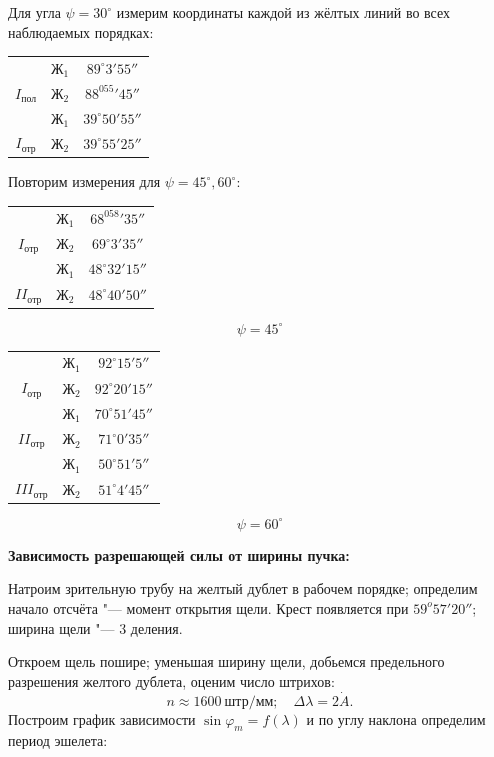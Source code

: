 Для угла $\psi = 30^\circ$ измерим координаты каждой из жёлтых линий во всех наблюдаемых порядках:

\begin{center}
\begin{tabular}{|c|c|c|} \hline
& $Ж_1$ & $89^\circ3'55''$ \\
\cline{2-3}
$I_{пол}$
& $Ж_2$ & $88^055'45''$ \\\hline
& $Ж_1$ & $39^\circ50'55''$ \\
\cline{2-3}
$I_{отр}$
& $Ж_2$ & $39^\circ55'25''$ \\\hline
\end{tabular}
\end{center}
Повторим измерения для $\psi = 45^\circ, 60^\circ$:
   
\begin{center}
\begin{tabular}{|c|c|c|} \hline
& $Ж_1$ & $68^058'35''$\\
\cline{2-3}
$I_{отр}$
& $Ж_2$ & $69^\circ3'35''$ \\\hline
& $Ж_1$ & $48^\circ32'15''$ \\
\cline{2-3}
$II_{отр}$
& $Ж_2$ & $48^\circ40'50''$ \\\hline
\end{tabular}
$$\psi = 45^\circ$$
\end{center}
  
\begin{center}
\begin{tabular}{|c|c|c|} \hline
& $Ж_1$ & $92^\circ15'5''$\\
\cline{2-3}
$I_{отр}$
& $Ж_2$ & $92^\circ20'15''$ \\\hline
& $Ж_1$ & $70^\circ51'45''$ \\
\cline{2-3}
$II_{отр}$
& $Ж_2$ & $71^\circ0'35''$ \\\hline
& $Ж_1$ & $50^\circ51'5''$\\
\cline{2-3}
$III_{отр}$
& $Ж_2$ & $51^\circ4'45''$ \\\hline
\end{tabular}
$$\psi = 60^\circ$$
\end{center}

\textbf{Зависимость разрешающей силы от ширины пучка:}

Натроим зрительную трубу на желтый дублет в рабочем порядке; определим начало отсчёта "--- момент открытия щели. Крест появляется при $59^o57'20''$; ширина щели "--- 3 деления.

Откроем щель пошире; уменьшая ширину щели, добьемся предельного разрешения желтого дублета, оценим число штрихов:
\[
     n \approx 1600\ \text{штр}/\text{мм}; \quad \Delta \lambda = 2 \dot A.
\]
Построим график зависимости $\sin \varphi_m = f(\lambda)$ и по углу наклона определим период эшелета:

